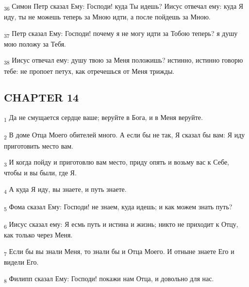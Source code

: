\begin{tcolorbox}
\textsubscript{36} Симон Петр сказал Ему: Господи! куда Ты идешь? Иисус отвечал ему: куда Я иду, ты не можешь теперь за Мною идти, а после пойдешь за Мною.
\end{tcolorbox}
\begin{tcolorbox}
\textsubscript{37} Петр сказал Ему: Господи! почему я не могу идти за Тобою теперь? я душу мою положу за Тебя.
\end{tcolorbox}
\begin{tcolorbox}
\textsubscript{38} Иисус отвечал ему: душу твою за Меня положишь? истинно, истинно говорю тебе: не пропоет петух, как отречешься от Меня трижды.
\end{tcolorbox}
\subsection{CHAPTER 14}
\begin{tcolorbox}
\textsubscript{1} Да не смущается сердце ваше; веруйте в Бога, и в Меня веруйте.
\end{tcolorbox}
\begin{tcolorbox}
\textsubscript{2} В доме Отца Моего обителей много. А если бы не так, Я сказал бы вам: Я иду приготовить место вам.
\end{tcolorbox}
\begin{tcolorbox}
\textsubscript{3} И когда пойду и приготовлю вам место, приду опять и возьму вас к Себе, чтобы и вы были, где Я.
\end{tcolorbox}
\begin{tcolorbox}
\textsubscript{4} А куда Я иду, вы знаете, и путь знаете.
\end{tcolorbox}
\begin{tcolorbox}
\textsubscript{5} Фома сказал Ему: Господи! не знаем, куда идешь; и как можем знать путь?
\end{tcolorbox}
\begin{tcolorbox}
\textsubscript{6} Иисус сказал ему: Я есмь путь и истина и жизнь; никто не приходит к Отцу, как только через Меня.
\end{tcolorbox}
\begin{tcolorbox}
\textsubscript{7} Если бы вы знали Меня, то знали бы и Отца Моего. И отныне знаете Его и видели Его.
\end{tcolorbox}
\begin{tcolorbox}
\textsubscript{8} Филипп сказал Ему: Господи! покажи нам Отца, и довольно для нас.
\end{tcolorbox}
